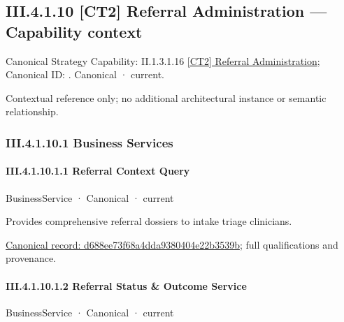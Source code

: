\subsection*{III.4.1.10 [CT2] Referral Administration — Capability context}
\label{navigation:III.4.1.10}

{\small Canonical Strategy Capability: II.1.3.1.16 \hyperref[element:ae0de25600ee416aa24d2a167b64f230]{[CT2] Referral Administration}; Canonical ID: \texttt{}. Canonical · current.}\par
Contextual reference only; no additional architectural instance or semantic relationship.\par
\subsubsection*{III.4.1.10.1 Business Services}
\label{navigation:III.4.1.10.1}

\paragraph*{III.4.1.10.1.1 Referral Context Query}
\label{navigation:III.4.1.10.1.1}

\label{element:d688ee73f68a4dda9380404e22b3539b}
{\small BusinessService · Canonical · current}\par

Provides comprehensive referral dossiers to intake triage clinicians.


{\footnotesize \href{../../../../../../../continuum/business/business-service/d688ee73f68a4dda9380404e22b3539b.md}{Canonical record: d688ee73f68a4dda9380404e22b3539b}; full qualifications and provenance.}\par
\paragraph*{III.4.1.10.1.2 Referral Status \& Outcome Service}
\label{navigation:III.4.1.10.1.2}

\label{element:dfd0481be6124da0a791db41a5e9c238}
{\small BusinessService · Canonical · current}\par

